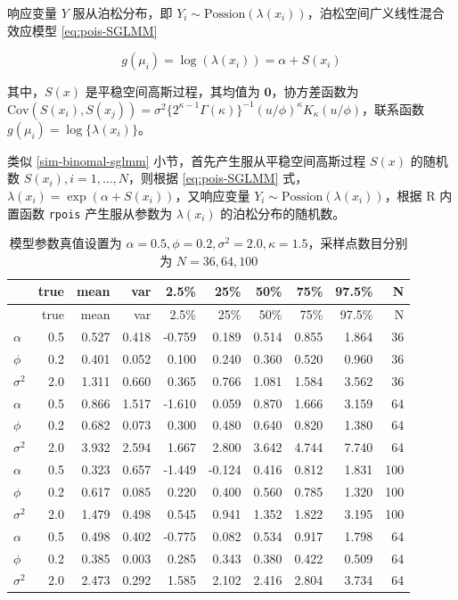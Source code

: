 \documentclass[12pt,a4paper,UTF8,twoside]{book}
\theoremstyle{definition}
\theoremstyle{definition}
\theoremstyle{definition}
\theoremstyle{remark}
\begin{document}
响应变量 \(Y\) 服从泊松分布，即
\(Y_i \sim \mathrm{Possion}(\lambda(x_{i}))\)，泊松空间广义线性混合效应模型
\eqref{eq:pois-SGLMM}

\begin{equation}
g(\mu_i) = \log(\lambda(x_i)) = \alpha + S(x_i) \label{eq:pois-SGLMM}
\end{equation}

\noindent 其中，\(S(x)\) 是平稳空间高斯过程，其均值为
\(\mathbf{0}\)，协方差函数为
\(\mathrm{Cov}(S(x_i),S(x_j)) = \sigma^2 \big\{2^{\kappa-1}\Gamma(\kappa)\big\}^{-1}(u/\phi)^{\kappa}K_{\kappa}(u/\phi)\)，联系函数
\(g(\mu_i) = \log\{\lambda(x_{i})\}\)。

类似 \ref{sim-binomal-sglmm} 小节，首先产生服从平稳空间高斯过程 \(S(x)\)
的随机数 \(S(x_i),i=1,\ldots,N\)，则根据 \eqref{eq:pois-SGLMM} 式，
\(\lambda(x_i) = \exp(\alpha + S(x_i))\)，又响应变量
\(Y_i \sim \mathrm{Possion}(\lambda(x_{i}))\)，根据 R 内置函数
\texttt{rpois} 产生服从参数为 \(\lambda(x_i)\) 的泊松分布的随机数。

\begin{longtable}[]{@{}lrrrrrrrrr@{}}
\caption{\label{tab:Pois-MCLV-vs-NUTS} 模型参数真值设置为
\(\alpha = 0.5, \phi = 0.2, \sigma^2 = 2.0, \kappa = 1.5\)，采样点数目分别为
\(N=36,64,100\)}\tabularnewline
\toprule
& true & mean & var & 2.5\% & 25\% & 50\% & 75\% & 97.5\% &
N\tabularnewline
\midrule
\endfirsthead
\toprule
& true & mean & var & 2.5\% & 25\% & 50\% & 75\% & 97.5\% &
N\tabularnewline
\midrule
\endhead
\(\alpha\) & 0.5 & 0.527 & 0.418 & -0.759 & 0.189 & 0.514 & 0.855 &
1.864 & 36\tabularnewline
\(\phi\) & 0.2 & 0.401 & 0.052 & 0.100 & 0.240 & 0.360 & 0.520 & 0.960 &
36\tabularnewline
\(\sigma^2\) & 2.0 & 1.311 & 0.660 & 0.365 & 0.766 & 1.081 & 1.584 &
3.562 & 36\tabularnewline
\(\alpha\) & 0.5 & 0.866 & 1.517 & -1.610 & 0.059 & 0.870 & 1.666 &
3.159 & 64\tabularnewline
\(\phi\) & 0.2 & 0.682 & 0.073 & 0.300 & 0.480 & 0.640 & 0.820 & 1.380 &
64\tabularnewline
\(\sigma^2\) & 2.0 & 3.932 & 2.594 & 1.667 & 2.800 & 3.642 & 4.744 &
7.740 & 64\tabularnewline
\(\alpha\) & 0.5 & 0.323 & 0.657 & -1.449 & -0.124 & 0.416 & 0.812 &
1.831 & 100\tabularnewline
\(\phi\) & 0.2 & 0.617 & 0.085 & 0.220 & 0.400 & 0.560 & 0.785 & 1.320 &
100\tabularnewline
\(\sigma^2\) & 2.0 & 1.479 & 0.498 & 0.545 & 0.941 & 1.352 & 1.822 &
3.195 & 100\tabularnewline
\(\alpha\) & 0.5 & 0.498 & 0.402 & -0.775 & 0.082 & 0.534 & 0.917 &
1.798 & 64\tabularnewline
\(\phi\) & 0.2 & 0.385 & 0.003 & 0.285 & 0.343 & 0.380 & 0.422 & 0.509 &
64\tabularnewline
\(\sigma^2\) & 2.0 & 2.473 & 0.292 & 1.585 & 2.102 & 2.416 & 2.804 &
3.734 & 64\tabularnewline
\bottomrule
\end{longtable}
\end{document}
